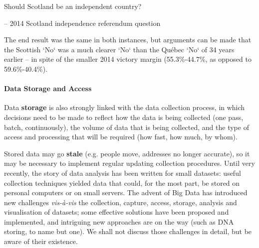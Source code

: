 \begin{tcolorbox}[title=Do You Think They Learned Something From 1980?]
Should Scotland be an independent country? \\[-0.6cm]
\begin{flushright}
-- 2014 Scotland independence referendum question
\end{flushright}
\end{tcolorbox}
\noindent The end result was the same in both instances, but arguments can be made that the Scottish `No` was a much clearer `No` than the Qu\'ebec `No` of 34 years earlier -- in spite of the smaller 2014 victory margin (55.3\%-44.7\%, as opposed to 59.6\%-40.4\%). 
\newpage\noindent
\paragraph{Data Storage and Access}
Data \textbf{storage} is also strongly linked with the data collection process, in which decisions need to be made to reflect how the data is being collected (one pass, batch, continuously), the volume of data that is being collected, and the type of access and processing that will be required (how fast, how much, by whom).\par Stored data may go \textbf{stale} (e.g. people move, addresses no longer accurate), so it may be necessary to implement regular updating collection procedures. 
\newl 
Until very recently, the story of data analysis has been written for small datasets: useful collection techniques yielded data that could, for the most part, be stored on personal computers or on small servers. The advent of Big Data has introduced new challenges \textit{vis-\`a-vis} the collection, capture, access, storage, analysis and visualisation of datasets; some effective solutions have been proposed and implemented, and intriguing new approaches are on the way (such as DNA storing, to name but one). We shall not discuss those challenges in detail, but be aware of their existence.  

